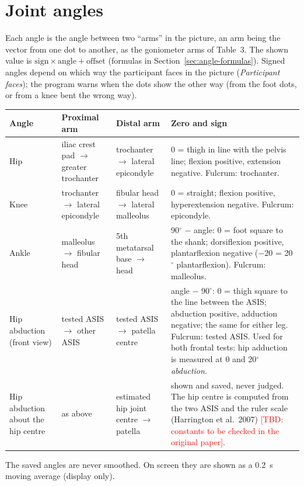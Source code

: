 \documentclass[a4paper,10pt]{article}
\newcommand{\dg}{\ensuremath{^\circ}}
\newcommand{\tbd}[1]{\textcolor{red}{[TBD: #1]}}
\begin{document}
\section{Joint angles}\label{sec:angles}
Each angle is the angle between two ``arms'' in the picture, an arm being the vector from one dot to another, as the goniometer arms of
Table~3. The shown value is $\text{sign}\times\text{angle}+\text{offset}$ (formulas in Section~\ref{sec:angle-formulas}). Signed angles depend on which way the participant faces in the
picture (\emph{Participant faces}); the program warns when the dots show the other way (from the foot dots, or from a knee bent the wrong
way).

\begin{tabularx}{\linewidth}{@{}P{2.4cm}P{3.1cm}P{3.1cm}L@{}}
\toprule
Angle & Proximal arm & Distal arm & Zero and sign \\
\midrule
Hip & iliac crest pad $\rightarrow$ greater trochanter & trochanter $\rightarrow$ lateral epicondyle & 0 = thigh in line with the pelvis
  line; flexion positive, extension negative. Fulcrum: trochanter. \\
Knee & trochanter $\rightarrow$ lateral epicondyle & fibular head $\rightarrow$ lateral malleolus & 0 = straight; flexion positive,
  hyperextension negative. Fulcrum: epicondyle. \\
Ankle & malleolus $\rightarrow$ fibular head & 5th metatarsal base $\rightarrow$ head & 90\dg{} $-$ angle: 0 = foot square to the shank;
  dorsiflexion positive, plantarflexion negative ($-20$ = 20\dg{} plantarflexion). Fulcrum: malleolus. \\
Hip abduction (front view) & tested ASIS $\rightarrow$ other ASIS & tested ASIS $\rightarrow$ patella centre & angle $-$ 90\dg: 0 = thigh
  square to the line between the ASIS; abduction positive, adduction negative; the same for either leg. Fulcrum: tested ASIS. Used for
  both frontal tests: hip adduction is measured at 0 and 20\dg{} \emph{abduction}. \\
Hip abduction about the hip centre & as above & estimated hip joint centre $\rightarrow$ patella & shown and saved, never judged. The hip
  centre is computed from the two ASIS and the ruler scale (Harrington et al.\ 2007) \tbd{constants to be checked in the original paper}. \\
\bottomrule
\end{tabularx}

\medskip\noindent The saved angles are never smoothed. On screen they are shown as a 0.2~s moving average (display only).
\end{document}
